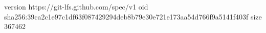 version https://git-lfs.github.com/spec/v1
oid sha256:39ca2c1e97c1df63f087429294deb8b79e30e721e173aa54d766f9a5141f403f
size 367462
